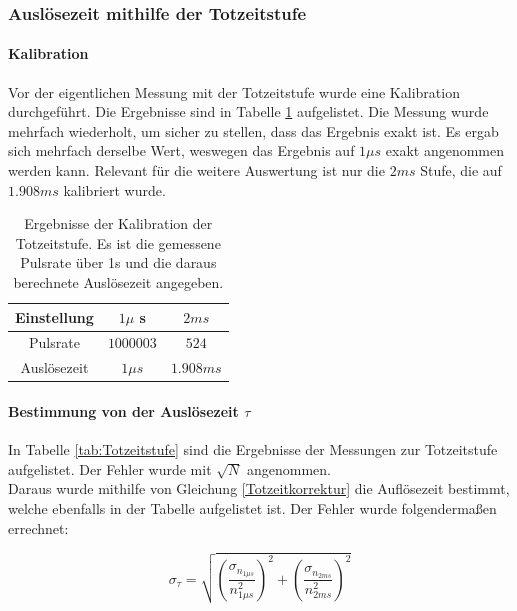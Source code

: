 \documentclass[12pt,a4paper]{article}
\begin{document}
\subsubsection{Auslösezeit mithilfe der Totzeitstufe}


\paragraph{Kalibration}
Vor der eigentlichen Messung mit der Totzeitstufe wurde eine Kalibration durchgeführt. Die Ergebnisse sind in Tabelle \ref{tab:Totzeitkalibration} aufgelistet. Die Messung wurde mehrfach wiederholt, um sicher zu stellen, dass das Ergebnis exakt ist. Es ergab sich mehrfach derselbe Wert, weswegen das Ergebnis auf $1\mu s$ exakt angenommen werden kann. Relevant für die weitere Auswertung ist nur die $2ms$ Stufe, die auf $1.908ms$ kalibriert wurde.

\begin{table}[H]
\centering
\begin{tabular}{|c|c||c|}
\hline
Einstellung & $1\mu$ s & $2ms$\\
\hline 
Pulsrate & $1000003$ & $524$ \\
\hline 
Auslösezeit & $1\mu s$ & $1.908ms$ \\
\hline
\end{tabular}
\caption{Ergebnisse der Kalibration der Totzeitstufe. Es ist die gemessene Pulsrate über 1s und die daraus berechnete Auslösezeit angegeben.}
\label{tab:Totzeitkalibration}
\end{table}

\paragraph{Bestimmung von der Auslösezeit $\tau$}



In Tabelle \ref{tab:Totzeitstufe} sind die Ergebnisse der Messungen zur Totzeitstufe aufgelistet. Der Fehler wurde mit $\sqrt{N}$ angenommen.\\
Daraus wurde mithilfe von Gleichung \ref{Totzeitkorrektur} die Auflösezeit bestimmt, welche ebenfalls in der Tabelle aufgelistet ist. Der Fehler wurde folgendermaßen errechnet:

\begin{equation}
\sigma_{\tau} = \sqrt{\left(\dfrac{\sigma_{n_{1\mu s}}}{n_{1\mu s}^{2}}\right)^2 + \left(\dfrac{\sigma_{n_{2ms}}}{n_{2ms}^{2}}\right)^2}
\end{equation}
\end{document}

